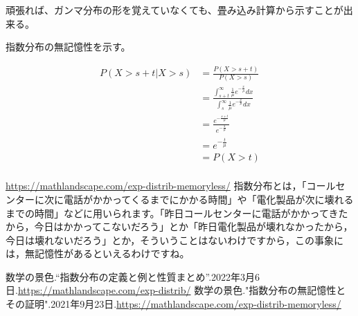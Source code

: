 \documentclass[a4paper, 10pt, dvipdfmx]{jlreq}
\begin{document}
頑張れば、ガンマ分布の形を覚えていなくても、畳み込み計算から示すことが出来る。

指数分布の無記憶性を示す。

\begin{align*}
    P(X>s+t|X>s) & =\frac{P(X>s+t)}{P(X>s)}                                                                                         \\
                 & =\frac{\int_{s+t}^{\infty}\frac{1}{\mu}e^{-\frac{x}{\mu}}dx}{\int_{s}^{\infty}\frac{1}{\mu}e^{-\frac{x}{\mu}}dx} \\
                 & =\frac{e^{-\frac{s+t}{\mu}}}{e^{-\frac{s}{\mu}}}                                                                 \\
                 & =e^{-\frac{t}{\mu}}                                                                                              \\
                 & =P(X>t)                                                                                                          \\
\end{align*}

\begin{itembox}[l]{\href{指数分布の無記憶性とその証明}{https://mathlandscape.com/exp-distrib-memoryless/}}
    指数分布とは，「コールセンターに次に電話がかかってくるまでにかかる時間」や「電化製品が次に壊れるまでの時間」などに用いられます。「昨日コールセンターに電話がかかってきたから，今日はかかってこないだろう」とか「昨日電化製品が壊れなかったから，今日は壊れないだろう」とか，そういうことはないわけですから，この事象には，無記憶性があるといえるわけですね。
\end{itembox}


\begin{thebibliography}{9}
    数学の景色.“指数分布の定義と例と性質まとめ”.2022年3月6日.\url{https://mathlandscape.com/exp-distrib/}
    数学の景色."指数分布の無記憶性とその証明".2021年9月23日.\url{https://mathlandscape.com/exp-distrib-memoryless/}
\end{thebibliography}
\end{document}
